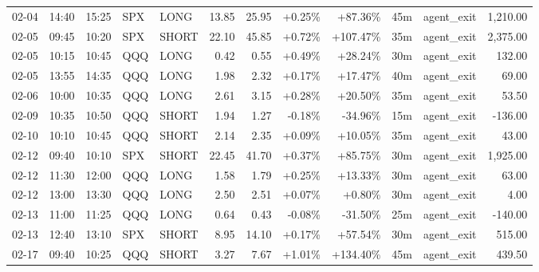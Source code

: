 \documentclass[11pt,a4paper,twoside]{article}
\begin{document}
\begin{center}
\begin{longtable}{>{\color{txtmain}}l l l l l r r r r r >{\color{txtmain}}l r}
02-04 & 14:40 & 15:25 & SPX & LONG & 13.85 & 25.95 & \textcolor{wingreen}{+0.25\%} & \textcolor{wingreen}{+87.36\%} & 45m & agent\_exit & \textcolor{wingreen}{1,210.00} \\
02-05 & 09:45 & 10:20 & SPX & SHORT & 22.10 & 45.85 & \textcolor{wingreen}{+0.72\%} & \textcolor{wingreen}{+107.47\%} & 35m & agent\_exit & \textcolor{wingreen}{2,375.00} \\
02-05 & 10:15 & 10:45 & QQQ & LONG & 0.42 & 0.55 & \textcolor{wingreen}{+0.49\%} & \textcolor{wingreen}{+28.24\%} & 30m & agent\_exit & \textcolor{wingreen}{132.00} \\
02-05 & 13:55 & 14:35 & QQQ & LONG & 1.98 & 2.32 & \textcolor{wingreen}{+0.17\%} & \textcolor{wingreen}{+17.47\%} & 40m & agent\_exit & \textcolor{wingreen}{69.00} \\
02-06 & 10:00 & 10:35 & QQQ & LONG & 2.61 & 3.15 & \textcolor{wingreen}{+0.28\%} & \textcolor{wingreen}{+20.50\%} & 35m & agent\_exit & \textcolor{wingreen}{53.50} \\
02-09 & 10:35 & 10:50 & QQQ & SHORT & 1.94 & 1.27 & \textcolor{lossred}{-0.18\%} & \textcolor{lossred}{-34.96\%} & 15m & agent\_exit & \textcolor{lossred}{-136.00} \\
02-10 & 10:10 & 10:45 & QQQ & SHORT & 2.14 & 2.35 & \textcolor{wingreen}{+0.09\%} & \textcolor{wingreen}{+10.05\%} & 35m & agent\_exit & \textcolor{wingreen}{43.00} \\
02-12 & 09:40 & 10:10 & SPX & SHORT & 22.45 & 41.70 & \textcolor{wingreen}{+0.37\%} & \textcolor{wingreen}{+85.75\%} & 30m & agent\_exit & \textcolor{wingreen}{1,925.00} \\
02-12 & 11:30 & 12:00 & QQQ & LONG & 1.58 & 1.79 & \textcolor{wingreen}{+0.25\%} & \textcolor{wingreen}{+13.33\%} & 30m & agent\_exit & \textcolor{wingreen}{63.00} \\
02-12 & 13:00 & 13:30 & QQQ & LONG & 2.50 & 2.51 & \textcolor{wingreen}{+0.07\%} & \textcolor{wingreen}{+0.80\%} & 30m & agent\_exit & \textcolor{wingreen}{4.00} \\
02-13 & 11:00 & 11:25 & QQQ & LONG & 0.64 & 0.43 & \textcolor{lossred}{-0.08\%} & \textcolor{lossred}{-31.50\%} & 25m & agent\_exit & \textcolor{lossred}{-140.00} \\
02-13 & 12:40 & 13:10 & SPX & SHORT & 8.95 & 14.10 & \textcolor{wingreen}{+0.17\%} & \textcolor{wingreen}{+57.54\%} & 30m & agent\_exit & \textcolor{wingreen}{515.00} \\
02-17 & 09:40 & 10:25 & QQQ & SHORT & 3.27 & 7.67 & \textcolor{wingreen}{+1.01\%} & \textcolor{wingreen}{+134.40\%} & 45m & agent\_exit & \textcolor{wingreen}{439.50} \\

\end{longtable}
\end{center}
\end{document}
